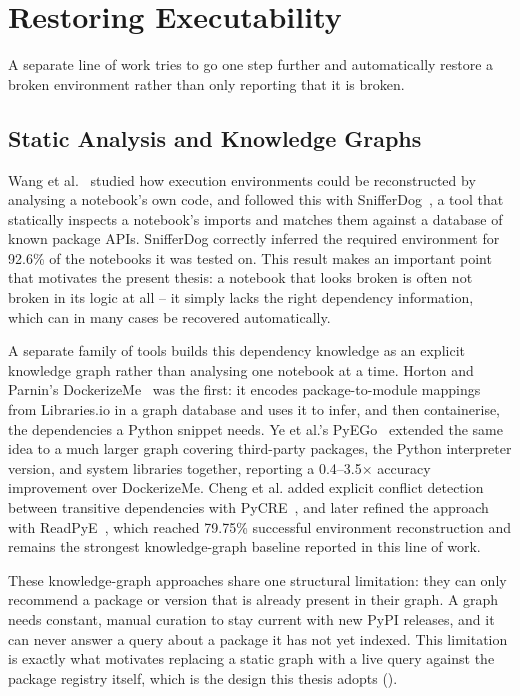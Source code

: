 \section{Restoring Executability}
\label{sec:rw-restoring}

A separate line of work tries to go one step further and automatically
restore a broken environment rather than only reporting that it is broken.

\subsection{Static Analysis and Knowledge Graphs}

Wang et al.~\cite{wang2020ase} studied how execution environments could be
reconstructed by analysing a notebook's own code, and followed this with
SnifferDog~\cite{wang2021snifferdog}, a tool that statically inspects a
notebook's imports and matches them against a database of known package
APIs. SnifferDog correctly inferred the required environment for 92.6\% of
the notebooks it was tested on. This result makes an important point that
motivates the present thesis: a notebook that looks broken is often not
broken in its logic at all -- it simply lacks the right dependency
information, which can in many cases be recovered automatically.

A separate family of tools builds this dependency knowledge as an explicit
knowledge graph rather than analysing one notebook at a time. Horton and
Parnin's DockerizeMe~\cite{horton2019dockerizeme} was the first: it encodes
package-to-module mappings from Libraries.io in a graph database and uses it
to infer, and then containerise, the dependencies a Python snippet needs.
Ye et al.'s PyEGo~\cite{ye2022pyego} extended the same idea to a much larger
graph covering third-party packages, the Python interpreter version, and
system libraries together, reporting a 0.4--3.5$\times$ accuracy improvement
over DockerizeMe. Cheng et al. added explicit conflict detection between
transitive dependencies with PyCRE~\cite{cheng2022pycre}, and later refined
the approach with ReadPyE~\cite{cheng2024readpye}, which reached 79.75\%
successful environment reconstruction and remains the strongest
knowledge-graph baseline reported in this line of work.

These knowledge-graph approaches share one structural limitation: they can
only recommend a package or version that is already present in their graph.
A graph needs constant, manual curation to stay current with new PyPI
releases, and it can never answer a query about a package it has not yet
indexed. This limitation is exactly what motivates replacing a static graph
with a live query against the package registry itself, which is the design
this thesis adopts ().

